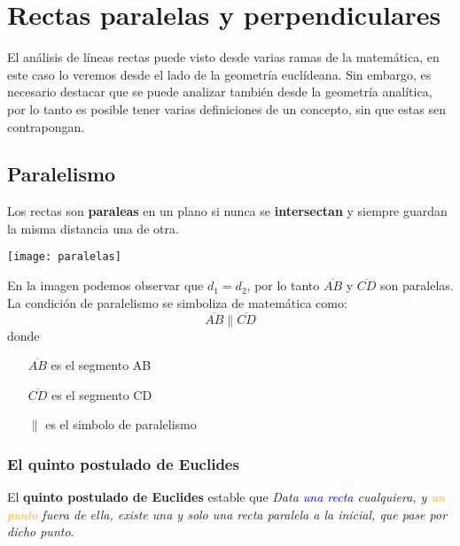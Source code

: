 \newpage
\section{Rectas paralelas y perpendiculares}

El análisis de líneas rectas puede visto desde varias ramas de la matemática, 
en este caso lo veremos desde el lado de la geometría euclídeana. Sin embargo,
es necesario destacar que se puede analizar también desde la geometría 
analítica, por lo tanto es posible tener varias definiciones de un concepto, 
sin que estas sen contrapongan.


\subsection{Paralelismo}


\begin{definition}
  Los rectas son \textbf{paraleas} en un plano si nunca se \textbf{intersectan} 
  y siempre guardan la misma distancia una de otra.
  \begin{center}
    \texttt{[image: paralelas]}
  \end{center}
  En la imagen podemos observar que $d_1 = d_ 2$, por lo tanto $\overline{AB}$ y 
  $\overline{CD}$ son paralelas.\\

  La condición de paralelismo se simboliza de matemática como:
  \[\overline{AB} \parallel \overline{CD}\]
  donde 
  \begin{itemize}
    \item [$\overline{AB}$] es el segmento AB
    \item [$\overline{CD}$] es el segmento CD
    \item [$\parallel$] es el simbolo de paralelismo
  \end{itemize}
\end{definition}

\subsubsection{El quinto postulado de Euclides}

El \textbf{quinto postulado de Euclides} estable que \textit{Data  
\textcolor{blue}{una recta} cualquiera, y \textcolor{orange}{un punto} 
fuera de ella, existe una y solo una recta paralela a la inicial, que pase 
por dicho punto}.

